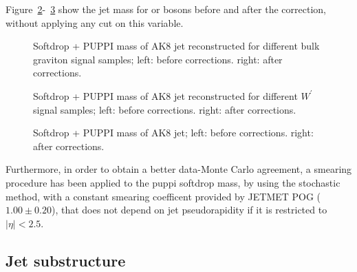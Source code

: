 Figure~\ref{fig:fatjet_pre_softdroppuppimass_ZZ}-~\ref{fig:fatjet_softdroppuppimass} show the jet mass for \PW or \Z bosons before and after the correction, without applying any cut on this variable.

\begin{figure}[!htb]
  \begin{center}
  \end{center}
  \caption{Softdrop + PUPPI mass of AK8 jet reconstructed for different bulk graviton signal samples; left: before corrections. right: after corrections.}
  \label{fig:fatjet_pre_softdroppuppimass_ZZ}
\end{figure}

\begin{figure}[!htb]
  \begin{center}
  \end{center}
  \caption{Softdrop + PUPPI mass of AK8 jet reconstructed for different $W^{'}$ signal samples; left: before corrections. right: after corrections.}
  \label{fig:fatjet_pre_softdroppuppimass_ZZ}
\end{figure}

\begin{figure}[!htb]
  \begin{center}
  \end{center}
  \caption{Softdrop + PUPPI mass of AK8 jet; left: before corrections. right: after corrections.}
  \label{fig:fatjet_softdroppuppimass}
\end{figure}

Furthermore, in order to obtain a better data-Monte Carlo agreement, a smearing procedure has been applied to the puppi softdrop mass, by using the stochastic method, with a constant smearing coefficent provided by JETMET POG ($1.00 \pm 0.20$), that does not depend on jet pseudorapidity if it is restricted to $|\eta|<2.5$.

\subsection{Jet substructure}\label{ssec:jetsub}

